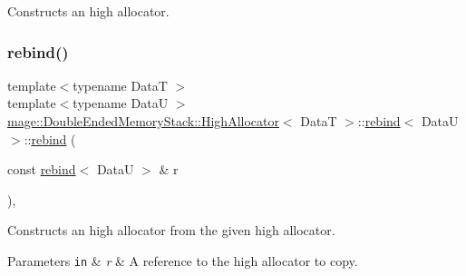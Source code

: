 Constructs an high allocator. \hypertarget{structmage_1_1_double_ended_memory_stack_1_1_high_allocator_1_1rebind_a88c79557499775912a9697151b0a6282}{}\label{structmage_1_1_double_ended_memory_stack_1_1_high_allocator_1_1rebind_a88c79557499775912a9697151b0a6282} 
\subsubsection{\texorpdfstring{rebind()}{rebind()}\hspace{0.1cm}{\footnotesize\ttfamily [2/3]}}
{\footnotesize\ttfamily template$<$typename DataT $>$ \\
template$<$typename DataU $>$ \\
\hyperlink{structmage_1_1_double_ended_memory_stack_1_1_high_allocator}{mage\+::\+Double\+Ended\+Memory\+Stack\+::\+High\+Allocator}$<$ DataT $>$\+::\hyperlink{structmage_1_1_double_ended_memory_stack_1_1_high_allocator_1_1rebind}{rebind}$<$ DataU $>$\+::\hyperlink{structmage_1_1_double_ended_memory_stack_1_1_high_allocator_1_1rebind}{rebind} (\begin{DoxyParamCaption}\item[{const \hyperlink{structmage_1_1_double_ended_memory_stack_1_1_high_allocator_1_1rebind}{rebind}$<$ DataU $>$ \&}]{r }\end{DoxyParamCaption})\hspace{0.3cm}{\ttfamily [private]}, {\ttfamily [delete]}}

Constructs an high allocator from the given high allocator.


\begin{DoxyParams}[1]{Parameters}
\mbox{\tt in}  & {\em r} & A reference to the high allocator to copy. \\
\hline
\end{DoxyParams}
\hypertarget{structmage_1_1_double_ended_memory_stack_1_1_high_allocator_1_1rebind_a8027a8c5ed9e55a9e3db30f0d9dc3347}{}\label{structmage_1_1_double_ended_memory_stack_1_1_high_allocator_1_1rebind_a8027a8c5ed9e55a9e3db30f0d9dc3347} 

